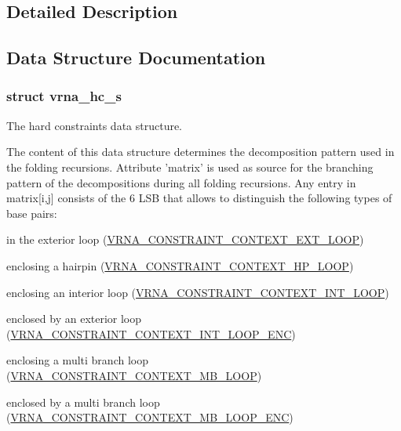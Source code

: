 \subsection{Detailed Description}


\subsection{Data Structure Documentation}
\label{structvrna__hc__s}
\hypertarget{group__hard__constraints_structvrna__hc__s}{}
\subsubsection{struct vrna\-\_\-hc\-\_\-s}
The hard constraints data structure. 

The content of this data structure determines the decomposition pattern used in the folding recursions. Attribute 'matrix' is used as source for the branching pattern of the decompositions during all folding recursions. Any entry in matrix\mbox{[}i,j\mbox{]} consists of the 6 L\-S\-B that allows to distinguish the following types of base pairs\-:
\begin{DoxyItemize}
\item in the exterior loop (\hyperlink{group__hard__constraints_ga9418eda62a5dec070896702c279d2548}{V\-R\-N\-A\-\_\-\-C\-O\-N\-S\-T\-R\-A\-I\-N\-T\-\_\-\-C\-O\-N\-T\-E\-X\-T\-\_\-\-E\-X\-T\-\_\-\-L\-O\-O\-P})
\item enclosing a hairpin (\hyperlink{group__hard__constraints_ga79203702b197b6b9d3b78eed40663eb1}{V\-R\-N\-A\-\_\-\-C\-O\-N\-S\-T\-R\-A\-I\-N\-T\-\_\-\-C\-O\-N\-T\-E\-X\-T\-\_\-\-H\-P\-\_\-\-L\-O\-O\-P})
\item enclosing an interior loop (\hyperlink{group__hard__constraints_ga21feeab3a9e5fa5a9e3d9ac0fcf5994f}{V\-R\-N\-A\-\_\-\-C\-O\-N\-S\-T\-R\-A\-I\-N\-T\-\_\-\-C\-O\-N\-T\-E\-X\-T\-\_\-\-I\-N\-T\-\_\-\-L\-O\-O\-P})
\item enclosed by an exterior loop (\hyperlink{group__hard__constraints_ga0536288e04ff6332ecdc23ca4705402b}{V\-R\-N\-A\-\_\-\-C\-O\-N\-S\-T\-R\-A\-I\-N\-T\-\_\-\-C\-O\-N\-T\-E\-X\-T\-\_\-\-I\-N\-T\-\_\-\-L\-O\-O\-P\-\_\-\-E\-N\-C})
\item enclosing a multi branch loop (\hyperlink{group__hard__constraints_ga456ecd2ff00056bb64da8dd4f61bbfc5}{V\-R\-N\-A\-\_\-\-C\-O\-N\-S\-T\-R\-A\-I\-N\-T\-\_\-\-C\-O\-N\-T\-E\-X\-T\-\_\-\-M\-B\-\_\-\-L\-O\-O\-P})
\item enclosed by a multi branch loop (\hyperlink{group__hard__constraints_ga02a3d703ddbcfce393e4bbfcb9db7077}{V\-R\-N\-A\-\_\-\-C\-O\-N\-S\-T\-R\-A\-I\-N\-T\-\_\-\-C\-O\-N\-T\-E\-X\-T\-\_\-\-M\-B\-\_\-\-L\-O\-O\-P\-\_\-\-E\-N\-C})
\end{DoxyItemize}

